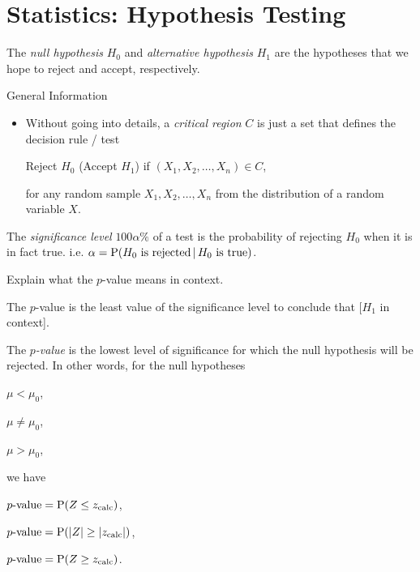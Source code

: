 \documentclass[../Notes.tex]{subfiles}
\begin{document}
\chapter{Statistics: Hypothesis Testing}
\begin{definition}{}{}
  The \emph{null hypothesis} \(H_0\) and \emph{alternative hypothesis} \(H_1\) are the hypotheses that we hope to reject and accept, respectively. 
\end{definition}
\begin{stbox}{General Information}
  \begin{itemize}
    \item Without going into details, a \emph{critical region} \(C\) is just a set that defines the decision rule / test 
    \begin{center}
      Reject \(H_0\) (Accept \(H_1\)) \quad if \((X_1,X_2,\dots,X_n)\in C\),
    \end{center}
    for any random sample \(X_1,X_2,\dots,X_n\) from the distribution of a random variable \(X\).
  \end{itemize}
\end{stbox}
\begin{definition}{}{}
  The \emph{significance level} \(100\alpha\%\) of a test is the probability of rejecting \(H_0\) when it is in fact true. i.e. \(\alpha=\operatorname{P}(H_0\text{ is rejected}\,\vert\,H_0\text{ is true})\).
\end{definition}
\begin{note}
  Explain what the \(p\)-value means in context.
  \begin{center}
    \parbox{0.9\textwidth}{
      The \(p\)-value is the least value of the significance level to conclude that [\(H_1\) in context].
    }
  \end{center}
\end{note}
\begin{definition}{}{}
  The \emph{\(p\)-value} is the lowest level of significance for which the null hypothesis will be rejected. In other words, for the null hypotheses
    \begin{center}
      \begin{enumerate*}[label=(\alph*),itemjoin={\quad}]
        \item \(\mu<\mu_0\),
        \item \(\mu \neq \mu_0\),
        \item \(\mu>\mu_0\),
      \end{enumerate*}
    \end{center}
    we have
    \begin{center}
      \begin{enumerate*}[label=(\alph*),itemjoin={\quad}]
        \item \(p\text{-value}=\operatorname{P}(Z\leq z_\text{calc})\),
        \item \(p\text{-value}=\operatorname{P}(\lvert Z \rvert\geq \lvert z_\text{calc} \rvert)\),
        \item \(p\text{-value}=\operatorname{P}(Z\geq z_\text{calc})\).
      \end{enumerate*}
    \end{center}
\end{definition}
\end{document}
